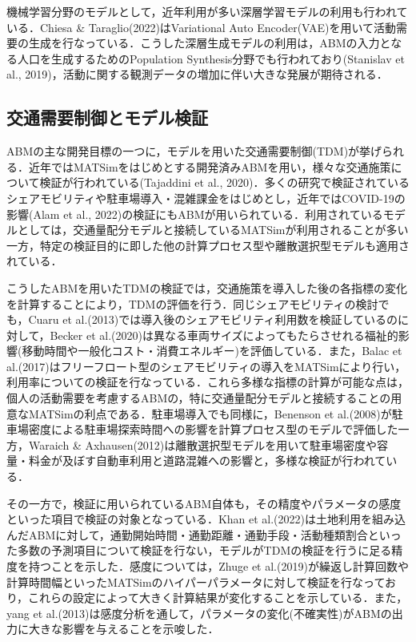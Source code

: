 機械学習分野のモデルとして，近年利用が多い深層学習モデルの利用も行われている．Chiesa \& Taraglio(2022)はVariational Auto Encoder(VAE)を用いて活動需要の生成を行なっている．こうした深層生成モデルの利用は，ABMの入力となる人口を生成するためのPopulation Synthesis分野でも行われており(Stanislav et al., 2019)，活動に関する観測データの増加に伴い大きな発展が期待される．

\subsection{交通需要制御とモデル検証}\label{2.2.2}

ABMの主な開発目標の一つに，モデルを用いた交通需要制御(TDM)が挙げられる．近年ではMATSimをはじめとする開発済みABMを用い，様々な交通施策について検証が行われている(Tajaddini et al., 2020)．多くの研究で検証されているシェアモビリティや駐車場導入・混雑課金をはじめとし，近年ではCOVID-19の影響(Alam et al., 2022)の検証にもABMが用いられている．利用されているモデルとしては，交通量配分モデルと接続しているMATSimが利用されることが多い一方，特定の検証目的に即した他の計算プロセス型や離散選択型モデルも適用されている．

こうしたABMを用いたTDMの検証では，交通施策を導入した後の各指標の変化を計算することにより，TDMの評価を行う．同じシェアモビリティの検討でも，Cuaru et al.(2013)では導入後のシェアモビリティ利用数を検証しているのに対して，Becker et al.(2020)は異なる車両サイズによってもたらさせれる福祉的影響(移動時間や一般化コスト・消費エネルギー)を評価している．また，Balac et al.(2017)はフリーフロート型のシェアモビリティの導入をMATSimにより行い，利用率についての検証を行なっている．これら多様な指標の計算が可能な点は，個人の活動需要を考慮するABMの，特に交通量配分モデルと接続することの用意なMATSimの利点である．駐車場導入でも同様に，Benenson et al.(2008)が駐車場密度による駐車場探索時間への影響を計算プロセス型のモデルで評価した一方，Waraich \& Axhausen(2012)は離散選択型モデルを用いて駐車場密度や容量・料金が及ぼす自動車利用と道路混雑への影響と，多様な検証が行われている．

その一方で，検証に用いられているABM自体も，その精度やパラメータの感度といった項目で検証の対象となっている．Khan et al.(2022)は土地利用を組み込んだABMに対して，通勤開始時間・通勤距離・通勤手段・活動種類割合といった多数の予測項目について検証を行ない，モデルがTDMの検証を行うに足る精度を持つことを示した．感度については，Zhuge et al.(2019)が繰返し計算回数や計算時間幅といったMATSimのハイパーパラメータに対して検証を行なっており，これらの設定によって大きく計算結果が変化することを示している．また，yang et al.(2013)は感度分析を通して，パラメータの変化(不確実性)がABMの出力に大きな影響を与えることを示唆した．

